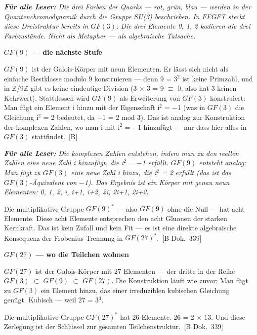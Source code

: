 \documentclass[11pt,oneside]{book}
\newcommand{\status}[1]{\penalty10000\,{\scriptsize\textcolor{gray!60}{[#1]}}}
\newenvironment{laierspur}{%
  \par\vspace{4pt}%
  \noindent\small\itshape\color{blue!60!black}%
  \textbf{Für alle Leser:}\enspace\ignorespaces}{%
  \par\vspace{4pt}\normalsize\normalfont\normalcolor}
\begin{document}
\begin{laierspur}
Die drei Farben der Quarks — rot, grün, blau — werden in
der Quantenchromodynamik durch die Gruppe SU(3) beschrieben. In FFGFT
steckt diese Dreistruktur bereits in $GF(3)$: Die drei Elemente {0, 1, 2}
kodieren die drei Farbzustände. Nicht als Metapher — als algebraische
Tatsache.
\end{laierspur}

\textbf{$GF(9)$ — die nächste Stufe}


$GF(9)$ ist der Galois-Körper mit neun Elementen. Er lässt sich nicht als
einfache Restklasse modulo 9 konstruieren — denn 9 = 3$^2$ ist keine Primzahl,
und in $\mathbb{Z}$/9$\mathbb{Z}$ gibt es keine eindeutige Division (3 $\times$ 3 = 9 $\equiv$ 0, also hat 3
keinen Kehrwert). Stattdessen wird $GF(9)$ als Erweiterung von $GF(3)$
konstruiert: Man fügt ein Element i hinzu mit der Eigenschaft i$^2$ = $-$1
(was in $GF(3)$ die Gleichung i$^2$ = 2 bedeutet, da $-$1 = 2 mod 3). Das ist
analog zur Konstruktion der komplexen Zahlen, wo man i mit i$^2$ = $-$1 hinzufügt
— nur dass hier alles in $GF(3)$ stattfindet. \status{B}


\begin{laierspur}
Die komplexen Zahlen entstehen, indem man zu den reellen Zahlen
eine neue Zahl i hinzufügt, die i$^2$ = $-$1 erfüllt. $GF(9)$ entsteht analog:
Man fügt zu $GF(3)$ eine neue Zahl i hinzu, die i$^2$ = 2 erfüllt (das ist
das $GF(3)$-Äquivalent von $-$1). Das Ergebnis ist ein Körper mit genau neun
Elementen: {0, 1, 2, i, i+1, i+2, 2i, 2i+1, 2i+2}.
\end{laierspur}

Die multiplikative Gruppe $GF(9)^*$ — also $GF(9)$ ohne die Null — hat acht
Elemente. Diese acht Elemente entsprechen den acht Gluonen der starken
Kernkraft. Das ist kein Zufall und kein Fit — es ist eine direkte
algebraische Konsequenz der Frobenius-Trennung in $GF(27)^*$. \status{B Dok.~339}


\textbf{$GF(27)$ — wo die Teilchen wohnen}


$GF(27)$ ist der Galois-Körper mit 27 Elementen — der dritte in der Reihe
$GF(3)$ $\subset$ $GF(9)$ $\subset$ $GF(27)$. Die Konstruktion läuft wie zuvor: Man fügt zu
$GF(3)$ ein Element hinzu, das einer irreduziblen kubischen Gleichung genügt.
Kubisch — weil 27 = 3$^3$.


Die multiplikative Gruppe $GF(27)^*$ hat 26 Elemente. 26 = 2 $\times$ 13. Und
diese Zerlegung ist der Schlüssel zur gesamten Teilchenstruktur. \status{B Dok.~339}
\end{document}
